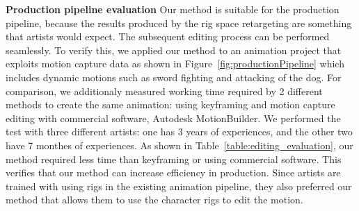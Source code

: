 \textbf{Production pipeline evaluation}
Our method is suitable for the production pipeline, because the results produced by the rig space retargeting are something that artists would expect.
The subsequent editing process can be performed seamlessly.
To verify this, we applied our method to an animation project that exploits motion capture data as shown in Figure~\ref{fig:productionPipeline} which includes dynamic motions such as sword fighting and attacking of the dog.
For comparison, we additionaly measured working time required by 2 different methods to create the same animation: using keyframing and motion capture editing with commercial software, Autodesk MotionBuilder.
We performed the test with three different artists: one has 3 years of experiences, and the other two have 7 monthes of experiences.
As shown in Table~\ref{table:editing_evaluation}, our method required less time than keyframing or using commercial software. This verifies that our method can increase  efficiency in production.
Since artists are trained with using rigs in the existing animation pipeline, they also preferred our method that allows them to use the character rigs to edit the motion.



